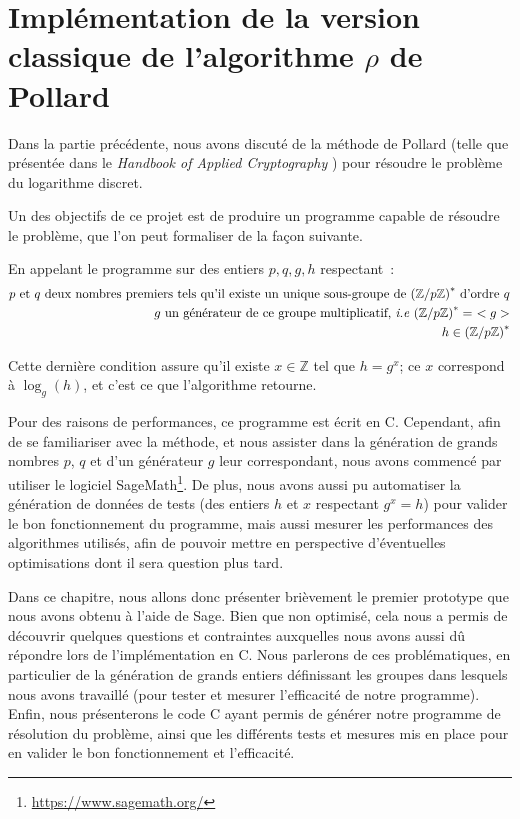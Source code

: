 \chapter{Implémentation de la version classique de l'algorithme \texorpdfstring{$\rho$}{Rho} de Pollard}
    Dans la partie précédente, nous avons discuté de la méthode de Pollard (telle que présentée dans le \textit{Handbook of Applied Cryptography} \autocite[106]{handbook}) pour résoudre le problème du logarithme discret.

    Un des objectifs de ce projet est de produire un programme capable de résoudre le problème, que l'on peut formaliser de la façon suivante.

    En appelant le programme sur des entiers $p, q, g, h$ respectant~:
    \begin{equation} \label{eq:2}
      \begin{split}
        p \text{\ et } q \text{\ deux nombres premiers tels qu'il existe un unique sous-groupe de } {(\mathbb{Z}/p\mathbb{Z})}^* \text{\ d'ordre } q \\
        g \text{\ un générateur de ce groupe multiplicatif, \textit{i.e} } {(\mathbb{Z}/p\mathbb{Z})}^* =\ < g > \\
        h \in {(\mathbb{Z}/p\mathbb{Z})}^*
      \end{split}
    \end{equation}

	  Cette dernière condition assure qu'il existe $x \in \mathbb{Z}$ tel que $h = g^x$; ce $x$ correspond à $\log_g(h)$, et c'est ce que l'algorithme retourne.

    Pour des raisons de performances, ce programme est écrit en C.
    Cependant, afin de se familiariser avec la méthode, et nous assister dans la génération de grands nombres $p$, $q$ et d'un générateur $g$ leur correspondant, nous avons commencé par utiliser le logiciel SageMath\footnote{\url{https://www.sagemath.org/}}. De plus, nous avons aussi pu automatiser la génération de données de tests (des entiers $h$ et $x$ respectant $g^x = h$) pour valider le bon fonctionnement du programme, mais aussi mesurer les performances des algorithmes utilisés, afin de pouvoir mettre en perspective d'éventuelles optimisations dont il sera question plus tard.

    Dans ce chapitre, nous allons donc présenter brièvement le premier prototype que nous avons obtenu à l'aide de Sage.
    Bien que non optimisé, cela nous a permis de découvrir quelques questions et contraintes auxquelles nous avons aussi dû répondre lors de l'implémentation en C.
    Nous parlerons de ces problématiques, en particulier de la génération de grands entiers définissant les groupes dans lesquels nous avons travaillé (pour tester et mesurer l'efficacité de notre programme).
    Enfin, nous présenterons le code C ayant permis de générer notre programme de résolution du problème, ainsi que les différents tests et mesures mis en place pour en valider le bon fonctionnement et l'efficacité.


